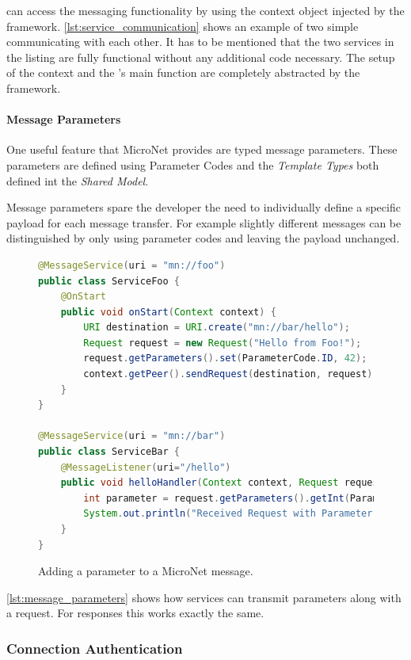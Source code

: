\mss{} can access the messaging functionality by using the context object
injected by the framework. \autoref{lst:service_communication} shows an example
of two simple \mss{} communicating with each other. It has to be mentioned that
the two services in the listing are fully functional without any additional
code necessary. The setup of the context and the \ms{}'s main function are
completely abstracted by the framework.

\paragraph{Message Parameters}

One useful feature that MicroNet provides are typed message parameters. These
parameters are defined using Parameter Codes and the \textit{Template Types}
both defined int the \textit{Shared Model}.

Message parameters spare the developer the need to individually define a
specific payload for each message transfer. For example slightly different
messages can be distinguished by only using parameter codes and leaving the
payload unchanged.

\begin{figure}
\begin{lstlisting}[language=Java,firstnumber=1] 
@MessageService(uri = "mn://foo")
public class ServiceFoo {
	@OnStart
	public void onStart(Context context) {
		URI destination = URI.create("mn://bar/hello");
		Request request = new Request("Hello from Foo!");
		request.getParameters().set(ParameterCode.ID, 42);
		context.getPeer().sendRequest(destination, request);
	}
}

@MessageService(uri = "mn://bar")
public class ServiceBar {
	@MessageListener(uri="/hello")
	public void helloHandler(Context context, Request request) {
		int parameter = request.getParameters().getInt(ParameterCode.ID);
		System.out.println("Received Request with Parameter: " + parameter);
	}
}
\end{lstlisting}
\caption{Adding a parameter to a MicroNet message.}
\label{lst:message_parameters}
\end{figure}

\autoref{lst:message_parameters} shows how services can transmit parameters
along with a request. For responses this works exactly the same.

\subsubsection{Connection Authentication}

